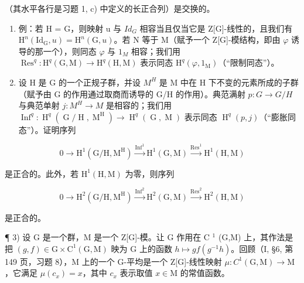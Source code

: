 （其水平各行是习题 1, c) 中定义的长正合列）是交换的。

\begin{enumerate}
\def\labelenumi{\alph{enumi})}
\setcounter{enumi}{3}
\item
  例：若 H = G，则映射 u 与 \(Id_{G}\) 相容当且仅当它是 Z{[}G{]}-线性的，且我们有 \(\mathrm{H}^{n}(\mathrm{Id}_{\mathrm{G}}, u) = \mathrm{H}^{n}(\mathrm{G}, u)\)。若 N 等于 M（赋予一个 Z{[}G{]}-模结构，即由 \(\varphi\) 诱导的那一个），则同态 \(\varphi\) 与 \(1_{M}\) 相容；我们用 \(\operatorname{Res}^{q} : \mathrm{H}^{q}(\mathrm{G}, \mathrm{M}) \to \mathrm{H}^{q}(\mathrm{H}, \mathrm{M})\) 表示同态 \(\mathrm{H}^{q}(\varphi, 1_{\mathrm{M}})\)（“限制同态”）。
\item
  设 H 是 G 的一个正规子群，并设 \(M^{H}\) 是 M 中在 H 下不变的元素所成的子群（赋予由 G 的作用通过取商而诱导的 G/H 的作用）。典范满射 \(p: G \rightarrow G/H\) 与典范单射 \(j: M^{H} \rightarrow M\) 是相容的；我们用 \(\operatorname{Inf}^{q}: \operatorname{H}^{q}(\operatorname{G}/\operatorname{H}, \operatorname{M}^{\operatorname{H}}) \to \operatorname{H}^{q}(\operatorname{G}, \operatorname{M})\) 表示同态 \(\operatorname{H}^{q}(p, j)\)（“膨胀同态”）。证明序列
\end{enumerate}

\[
0 \to \mathrm{H} ^ {1} (\mathrm{G} / \mathrm{H}, \mathrm{M} ^ {\mathrm{H}}) \xrightarrow {\operatorname{Inf} ^ {1}} \mathrm{H} ^ {1} (\mathrm{G}, \mathrm{M}) \xrightarrow {\operatorname{Res} ^ {1}} \mathrm{H} ^ {1} (\mathrm{H}, \mathrm{M})
\]

是正合的。此外，若 \(\mathrm{H}^1 (\mathrm{H},\mathrm{M})\) 为零，则序列

\[
0 \to \mathrm{H} ^ {2} (\mathrm{G} / \mathrm{H}, \mathrm{M} ^ {\mathrm{H}}) \xrightarrow {\operatorname{Inf} ^ {2}} \mathrm{H} ^ {2} (\mathrm{G}, \mathrm{M}) \xrightarrow {\operatorname{Res} ^ {2}} \mathrm{H} ^ {2} (\mathrm{H}, \mathrm{M})
\]

是正合的。

¶ 3) 设 G 是一个群，M 是一个 Z{[}G{]}-模。让 G 作用在 C \(^{1}\) (G,M) 上，其作法是把 \((g,f)\in\mathrm{G}\times\mathrm{C}^{1}(\mathrm{G},\mathrm{M})\) 映为 G 上的函数 \(h\mapsto gf(g^{-1}h)\)。回顾（I, §6, 第 149 页，习题 8），M 上的一个 G-平均是一个 Z{[}G{]}-线性映射 \(\mu:C^{1}(\mathrm{G},\mathrm{M})\to\mathrm{M}\)，它满足 \(\mu(c_{x})=x\)，其中 \(c_{x}\) 表示取值 \(x\in\mathrm{M}\) 的常值函数。

